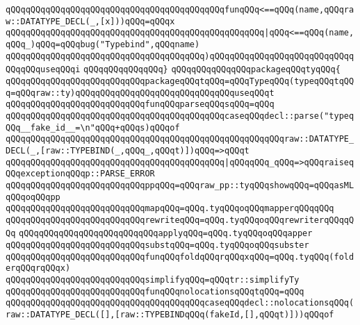 \verb|qQQqqQQqqQQqqQQqqQQqqQQqqQQqqQQqqQQqqQQqqQQqfunqQQq<==qQQq(name,qQQqraw::DATATYPE_DECL(_,[x]))qQQq=qQQqx|\newline
\verb|qQQqqQQqqQQqqQQqqQQqqQQqqQQqqQQqqQQqqQQqqQQqqQQqqQQq|\verb#|qQQq<==qQQq(name,qQQq_)qQQq=qQQqbug("Typebind",qQQqname)#\newline
\verb|qQQqqQQqqQQqqQQqqQQqqQQqqQQqqQQqqQQqqQQq)qQQqqQQqqQQqqQQqqQQqqQQqqQQqqQQqqQQquseqQQqi|\newline
\verb|qQQqqQQqqQQqqQQq}|\newline
\newline
\verb|qQQqqQQqqQQqqQQqpackageqQQqtyqQQq{|\newline
\newline
\verb|qQQqqQQqqQQqqQQqqQQqqQQqqQQqpackageqQQqtqQQq=qQQqTypeqQQq(typeqQQqtqQQq=qQQqraw::ty)qQQqqQQqqQQqqQQqqQQqqQQqqQQqqQQquseqQQqt|\newline
\verb|qQQqqQQqqQQqqQQqqQQqqQQqqQQqfunqQQqparseqQQqsqQQq=qQQq|\newline
\verb|qQQqqQQqqQQqqQQqqQQqqQQqqQQqqQQqqQQqqQQqqQQqcaseqQQqdecl::parse("typeqQQq__fake_id__=\n"qQQq+qQQqs)qQQqof|\newline
\verb|qQQqqQQqqQQqqQQqqQQqqQQqqQQqqQQqqQQqqQQqqQQqqQQqqQQqqQQqraw::DATATYPE_DECL(_,[raw::TYPEBIND(_,qQQq_,qQQqt)])qQQq=>qQQqt|\newline
\verb|qQQqqQQqqQQqqQQqqQQqqQQqqQQqqQQqqQQqqQQqqQQq|\verb#|qQQqqQQq_qQQq=>qQQqraiseqQQqexceptionqQQqp::PARSE_ERROR#\newline
\verb|qQQqqQQqqQQqqQQqqQQqqQQqqQQqppqQQq=qQQqraw_pp::tyqQQqshowqQQq=qQQqasMLqQQqoqQQqpp|\newline
\verb|qQQqqQQqqQQqqQQqqQQqqQQqqQQqmapqQQq=qQQq.tyqQQqoqQQqmapperqQQqqQQq|\newline
\verb|qQQqqQQqqQQqqQQqqQQqqQQqqQQqrewriteqQQq=qQQq.tyqQQqoqQQqrewriterqQQqqQQq|\newline
\verb|qQQqqQQqqQQqqQQqqQQqqQQqqQQqapplyqQQq=qQQq.tyqQQqoqQQqapper|\newline
\verb|qQQqqQQqqQQqqQQqqQQqqQQqqQQqsubstqQQq=qQQq.tyqQQqoqQQqsubster|\newline
\verb|qQQqqQQqqQQqqQQqqQQqqQQqqQQqfunqQQqfoldqQQqrqQQqxqQQq=qQQq.tyqQQq(folderqQQqrqQQqx)|\newline
\verb|qQQqqQQqqQQqqQQqqQQqqQQqqQQqsimplifyqQQq=qQQqtr::simplifyTy|\newline
\verb|qQQqqQQqqQQqqQQqqQQqqQQqqQQqfunqQQqnolocationsqQQqtqQQq=qQQq|\newline
\verb|qQQqqQQqqQQqqQQqqQQqqQQqqQQqqQQqqQQqqQQqcaseqQQqdecl::nolocationsqQQq(raw::DATATYPE_DECL([],[raw::TYPEBINDqQQq(fakeId,[],qQQqt)]))qQQqof|\newline
